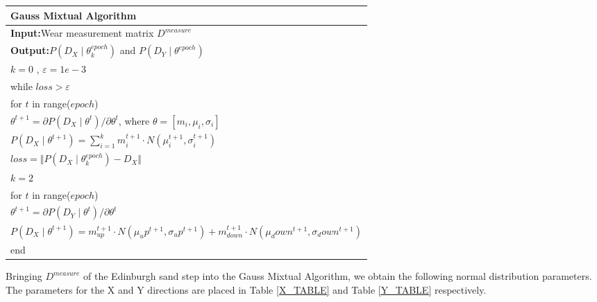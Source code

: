 \documentclass[12pt]{article}  %
\numberwithin{equation}{section} %
\begin{document}
\begin{table}[H]
    \centering
    \renewcommand{\arraystretch}{1.5}
    \setlength{\tabcolsep}{16pt}
    \begin{tabular}{>{\raggedright\arraybackslash}p{15cm}} 
        \hline
        \textbf{Gauss Mixtual Algorithm}\\ 
        \hline
        \textbf{Input:}\quad Wear measurement matrix $D^{measure}$\\  %
        \textbf{Output:}\quad $P(D_X\mid\theta_k^{epoch})$ and $P(D_Y\mid\theta^{epoch})$ \\
        \(k = 0\) , \(\varepsilon = 1e-3\)\\
        while \(loss>\varepsilon\)\\ 
        \qquad for \(t\) in range($epoch$)\\ 
       \qquad\qquad \(\theta^{t+1}=
{\partial P(D_X\mid\theta^{t})}/{\partial \theta^t}
\), where $\theta=[ m_i,\mu_i,\sigma_i ]$\\
       \qquad\qquad $P(D_X\mid\theta^{t+1})=\sum_{i=1}^{k}m_i^{t+1}\cdot{N(\mu_i^{t+1},\sigma_i^{t+1})}$\\
      \qquad $loss = \Vert P(D_X\mid\theta_k^{epoch})-D_X \Vert$ \\

\(k = 2\)\\
for \(t\) in range($epoch$)\\ 
       \qquad \(\theta^{t+1}=
{\partial P(D_Y\mid\theta^{t})}/{\partial \theta^t}
\)\\
    \qquad $P(D_X\mid\theta^{t+1})=m_{up}^{t+1}\cdot{N(\mu_up^{t+1},\sigma_up^{t+1})}+m_{down}^{t+1}\cdot{N(\mu_down^{t+1},\sigma_down^{t+1})}$\\
       end\\
        \hline
    \end{tabular}
    \vspace{-0.8em}
\end{table}
Bringing $D^{measure}$ of the  Edinburgh sand step into the Gauss Mixtual Algorithm, we obtain the following normal distribution parameters. The parameters for the X and Y directions are placed in Table \ref{X_TABLE} and Table \ref{Y_TABLE} respectively.
\end{document}
